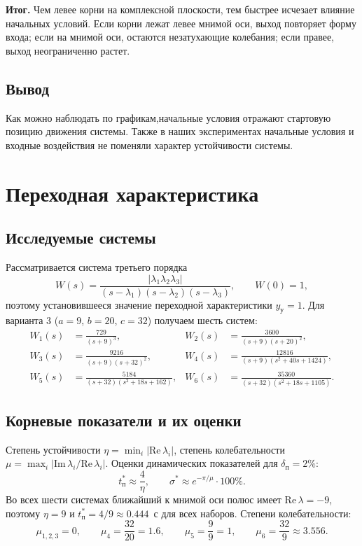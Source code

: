 \documentclass[14pt,a4paper]{extarticle}
\begin{document}
\textbf{Итог.} Чем левее корни на комплексной плоскости, тем быстрее исчезает влияние начальных условий. Если корни лежат левее мнимой оси, выход повторяет форму входа; если на мнимой оси, остаются незатухающие колебания; если правее, выход неограниченно растет.


\subsection{Вывод} 
Как можно наблюдать по графикам,начальные условия отражают стартовую позицию движения системы. Также в наших экспериментах начальные условия и входные воздействия не поменяли характер устойчивости системы.
\newpage
\section{ Переходная характеристика}

\subsection{Исследуемые системы}

Рассматривается система третьего порядка
\[
W(s) = \frac{|\lambda_1\lambda_2\lambda_3|}{(s-\lambda_1)(s-\lambda_2)(s-\lambda_3)}, \qquad W(0) = 1,
\]
поэтому установившееся значение переходной характеристики $y_\text{у} = 1$. Для варианта 3 ($a = 9$, $b = 20$, $c = 32$) получаем шесть систем:
\begin{align*}
W_1(s) &= \frac{729}{(s+9)^3}, &
W_2(s) &= \frac{3600}{(s+9)(s+20)^2}, \\
W_3(s) &= \frac{9216}{(s+9)(s+32)^2}, &
W_4(s) &= \frac{12816}{(s+9)(s^2+40s+1424)}, \\
W_5(s) &= \frac{5184}{(s+32)(s^2+18s+162)}, &
W_6(s) &= \frac{35360}{(s+32)(s^2+18s+1105)}.
\end{align*}

\subsection{Корневые показатели и их оценки}

Степень устойчивости $\eta = \min_i |\mathrm{Re}\,\lambda_i|$, степень колебательности $\mu = \max_i \left|\mathrm{Im}\,\lambda_i/\mathrm{Re}\,\lambda_i\right|$. Оценки динамических показателей для $\delta_\text{п} = 2\%$:
\[
t_\text{п}^* \approx \frac{4}{\eta}, \qquad \sigma^* \approx e^{-\pi/\mu}\cdot 100\%.
\]
Во всех шести системах ближайший к мнимой оси полюс имеет $\mathrm{Re}\,\lambda = -9$, поэтому $\eta = 9$ и $t_\text{п}^* = 4/9 \approx 0.444$~с для всех наборов. Степени колебательности:
\[
\mu_{1,2,3} = 0,\qquad \mu_4 = \frac{32}{20} = 1.6,\qquad \mu_5 = \frac{9}{9} = 1,\qquad \mu_6 = \frac{32}{9} \approx 3.556 .
\]
\end{document}

